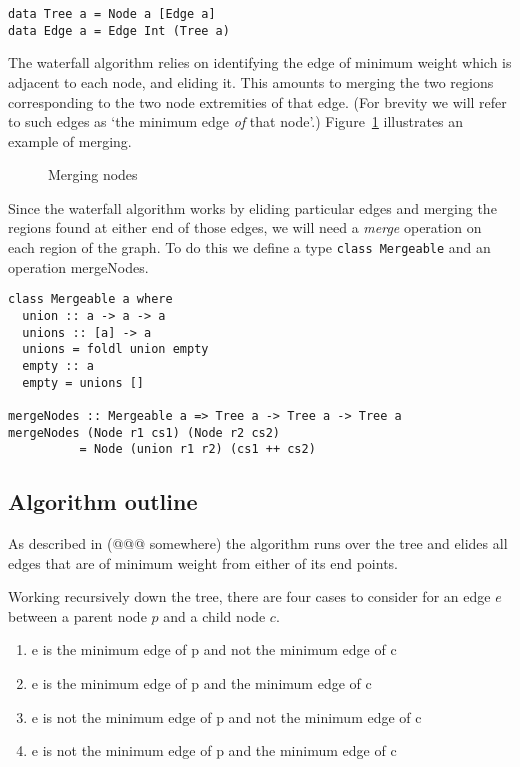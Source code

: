 \documentclass{jfp}
\begin{document}
\begin{verbatim}
data Tree a = Node a [Edge a]
data Edge a = Edge Int (Tree a)
\end{verbatim}


The waterfall algorithm relies on identifying the edge of minimum
weight which is adjacent to each node, and eliding it. This amounts to
merging the two regions corresponding to the two node extremities of
that edge.  (For brevity we will refer to such edges as `the minimum
edge {\em of\/} that node'.) Figure~\ref{fig:merging} illustrates an
example of merging.

\begin{figure}
\centering
\ifpdf
\else
\fi
\caption{Merging nodes}
\label{fig:merging}
\end{figure}

Since the waterfall algorithm works by eliding particular edges and
merging the regions found at either end of those edges, we will need a
{\em merge} operation on each region of the graph. To do this we
define a type {\tt class Mergeable} and an operation mergeNodes.

\begin{verbatim}
class Mergeable a where
  union :: a -> a -> a
  unions :: [a] -> a
  unions = foldl union empty
  empty :: a
  empty = unions []

mergeNodes :: Mergeable a => Tree a -> Tree a -> Tree a
mergeNodes (Node r1 cs1) (Node r2 cs2)
          = Node (union r1 r2) (cs1 ++ cs2)
\end{verbatim}


\subsection{Algorithm outline}

As described in (@@@ somewhere) the algorithm runs over the tree and
elides all edges that are of minimum weight from either of its end
points.

Working recursively down the tree, there are four cases to consider
for an edge $e$ between a parent node $p$ and a child node $c$.
\begin{enumerate}[I]
\item e is     the minimum edge of p and not the minimum edge of c
\item e is     the minimum edge of p and     the minimum edge of c
\item e is not the minimum edge of p and not the minimum edge of c
\item e is not the minimum edge of p and     the minimum edge of c
\end{enumerate}
\end{document}
